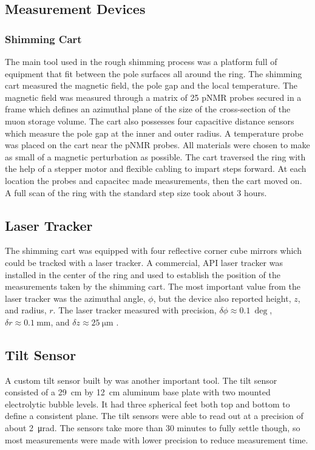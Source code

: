 \subsection{Measurement Devices}

\subsubsection{Shimming Cart}
The main tool used in the rough shimming process was a platform full of equipment that fit between the pole surfaces all around the ring.  The shimming cart measured the magnetic field, the pole gap and the local temperature.  The magnetic field was measured through a matrix of 25 pNMR probes secured in a frame which defines an azimuthal plane of the size of the cross-section of the muon storage volume. The cart also possesses four capacitive distance sensors which measure the pole gap at the inner and outer radius.  A temperature probe was placed on the cart near the pNMR probes.  All materials were chosen to make as small of a magnetic perturbation as possible.  The cart traversed the ring with the help of a stepper motor and flexible cabling to impart steps forward.  At each location the probes and capacitec made measurements, then the cart moved on.  A full scan of the ring with the standard step size took about 3 hours.


\subsection{Laser Tracker}
The shimming cart was equipped with four reflective corner cube mirrors which could be tracked with a laser tracker.  A commercial, API laser tracker was installed in the center of the ring and used to establish the position of the measurements taken by the shimming cart.  The most important value from the laser tracker was the azimuthal angle, $\phi$, but the device also reported height, $z$, and radius, $r$.  The laser tracker measured with precision, $\delta\phi \approx \SI{0.1}{\deg}$, $\delta r \approx \SI{0.1}{\milli\meter}$, and $\delta z \approx \SI{25}{\micro\meter}$ .

\subsection{Tilt Sensor}
A custom tilt sensor built by \uw was another important tool.  The tilt sensor consisted of a \SI{29}{\cm} by \SI{12}{\cm} aluminum base plate with two mounted electrolytic bubble levels.  It had three spherical feet both top and bottom to define a consistent plane.  The tilt sensors were able to read out at a precision of about \SI{2}{\micro\radian}.  The sensors take more than 30 minutes to fully settle though, so most measurements were made with lower precision to reduce measurement time.

